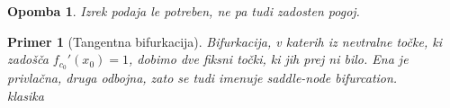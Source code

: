 \documentclass{article}
\newtheorem{opomba}{Opomba}
\newtheorem{primer}{Primer}
\begin{document}
\begin{opomba}
Izrek podaja le potreben, ne pa tudi zadosten pogoj.
\end{opomba}

\begin{primer}[Tangentna bifurkacija]
Bifurkacija, v katerih iz nevtralne točke, ki zadošča $f_{c_0}'(x_0) = 1$, dobimo dve fiksni točki, ki jih prej ni bilo. Ena je privlačna, druga odbojna, zato se tudi imenuje saddle-node bifurcation. \\
klasika\\ 



\end{primer}



%
%

\end{document}
